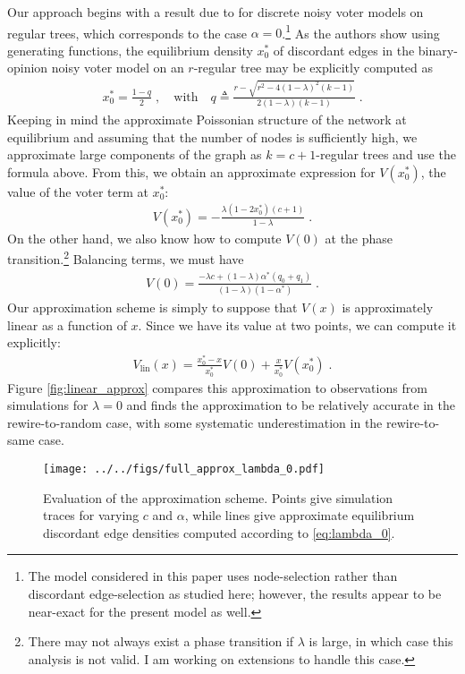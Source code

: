 \documentclass[english]{scrartcl}
\begin{document}
	Our approach begins with a result due to \cite{Allen2012} for discrete noisy voter models on regular trees, which corresponds to the case $\alpha = 0$.\footnote{The model considered in this paper uses node-selection rather than discordant edge-selection as studied here; however, the results appear to be near-exact for the present model as well.} As the authors show using generating functions, the equilibrium density $x_0^*$ of discordant edges in the binary-opinion noisy voter model on an $r$-regular tree may be explicitly computed as 
	\begin{align*}
		x_0^* = \frac{1-q}{2}\;,\quad \text{with} \quad q \triangleq \frac{r - \sqrt{r^2 - 4(1-\lambda)^2(k-1)}}{2(1-\lambda)(k-1)}\;.
	\end{align*}
	Keeping in mind the approximate Poissonian structure of the network at equilibrium and assuming that the number of nodes is sufficiently high, we approximate large components of the graph as $k = c+1$-regular trees and use the formula above. From this, we obtain an approximate expression for $V(x_0^*)$, the value of the voter term at $x_0^*$:
	\begin{align*}
		V(x_0^*) = -\frac{\lambda(1-2x_0^*)(c+1)}{1-\lambda}\;.
	\end{align*}
	On the other hand, we also know how to compute $V(0)$ at the phase transition.\footnote{There may not always exist a phase transition if $\lambda$ is large, in which case this analysis is not valid. I am working on extensions to handle this case.} Balancing terms, we must have 
	\begin{align*}
		V(0) = \frac{-\lambda c + (1-\lambda)\alpha^*(q_0 + q_1)}{(1-\lambda)(1-\alpha^*)}\;.
	\end{align*}
	Our approximation scheme is simply to suppose that $V(x)$ is approximately linear as a function of $x$. Since we have its value at two points, we can compute it explicitly: 
	\begin{align}
		V_{\text{lin}}(x) = \frac{x_0^* - x}{x_0^*}V(0) + \frac{x}{x_0^*} V(x^*_0)\label{eq:linear_approx}\;.
	\end{align}
	Figure \ref{fig:linear_approx} compares this approximation to observations from simulations for $\lambda = 0$ and finds the approximation to be relatively accurate in the rewire-to-random case, with some systematic underestimation in the rewire-to-same case. 
	
	\begin{figure}
		\centering
		\texttt{[image: ../../figs/full\_approx\_lambda\_0.pdf]}
		\caption{Evaluation of the approximation scheme. Points give simulation traces for varying $c$ and $\alpha$, while lines give approximate equilibrium discordant edge densities computed according to \eqref{eq:lambda_0}.} \label{fig:full_approx}
	\end{figure}
\end{document}
